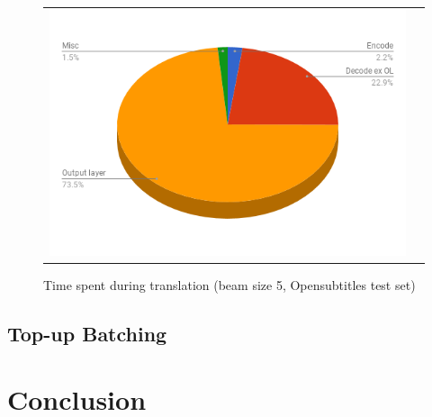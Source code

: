 \documentclass[11pt,a4paper]{article}
\begin{document}
\begin{figure}
\centering
\begin{tabular}{cc}
{\includegraphics[scale=0.3]{pie-time-opensubtitles.png}} 
\end{tabular}
\caption{Time spent during translation (beam size 5, Opensubtitles test set)}
\label{fig:pie-time-opensubtitles}
\end{figure} 

\subsection{Top-up Batching}

\section{Conclusion}






\end{document}
